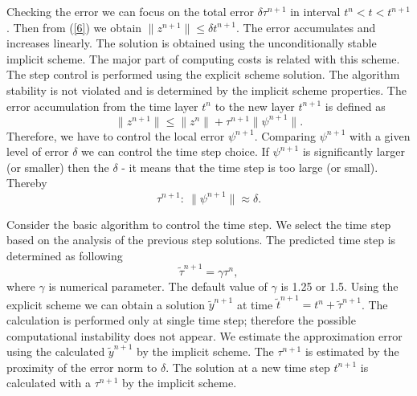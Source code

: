 \documentclass{aip-cp}
\begin{document}
Checking the error we can focus on the total error $\delta\tau^{n+1}$ in interval $t^n < t < t^{n+1}$. Then from (\ref{6}) we obtain
$\|z^{n+1}\| \leq \delta t^{n+1}.$
The error accumulates and increases linearly.
The solution is obtained using the unconditionally stable implicit scheme.
The major part of computing costs is related with this scheme.
The step control is performed using the explicit scheme solution.
The algorithm stability is not violated and is determined by the implicit scheme properties.
The error accumulation from the time layer $t^n$ to the new layer $t^{n+1}$  is defined as
\begin{equation}\label{7}
\|z^{n+1}\| \leq \|z^{n}\| + \tau^{n+1} \|\psi^{n+1}\| .
\end{equation}
Therefore, we have to control the local error $\psi^{n+1}$. Comparing $\psi^{n+1}$ with a given level of error $\delta$ we can control the time step choice. If $\psi^{n+1}$ is significantly larger (or smaller) then the $\delta$ - it means that the time step is too large (or small). Thereby
\begin{equation}\label{8}
  \tau^{n+1}: \ \|\psi^{n+1}\| \approx \delta .
\end{equation} 

Consider the basic algorithm to control the time step. We select the time step based on the analysis of the previous step solutions. The predicted time step is determined as following
\begin{equation}\label{9}
 \widetilde{\tau}^{n+1} = \gamma \tau^n , 
\end{equation}
where $\gamma$ is numerical parameter. The default value of $\gamma$ is 1.25 or 1.5. Using the explicit scheme we can obtain a solution $\widetilde{y}^{n+1}$ at time $\widetilde{t}^{n+1} = t^n + \widetilde{\tau}^{n+1}$. The calculation is performed only at single time step;  therefore the possible computational instability does not appear.
We estimate the approximation error using the calculated $\widetilde{y}^{n+1}$ by the implicit scheme. The $\tau^{n+1}$ is estimated by the proximity of the error norm to $\delta$. The solution at a new time step $t^{n+1}$ is calculated with a $\tau^{n+1}$  by the implicit scheme.

\end{document}
